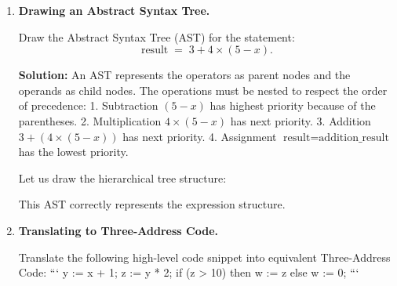 \documentclass[12pt, a4paper]{book}
\begin{document}
\begin{problembox}
\begin{enumerate}[label=\textbf{E\arabic*.}]
  \item \textbf{Drawing an Abstract Syntax Tree.}
  
        Draw the Abstract Syntax Tree (AST) for the statement:
        \[
          \text{result} \;=\; 3 + 4 \times (5 - x).
        \]
        
        \textbf{Solution:}
        An AST represents the operators as parent nodes and the operands as child nodes.
        The operations must be nested to respect the order of precedence:
        1. Subtraction $(5 - x)$ has highest priority because of the parentheses.
        2. Multiplication $4 \times (5 - x)$ has next priority.
        3. Addition $3 + (4 \times (5 - x))$ has next priority.
        4. Assignment $\text{result} = \text{addition\_result}$ has the lowest priority.
        
        Let us draw the hierarchical tree structure:
        \begin{center}
        \end{center}
        This AST correctly represents the expression structure.
        
  \item \textbf{Translating to Three-Address Code.}
  
        Translate the following high-level code snippet into equivalent Three-Address Code:
        ```
          y := x + 1;
          z := y * 2;
          if (z > 10) then
              w := z
          else
              w := 0;
        ```
        

\end{enumerate}
\end{problembox}
\end{document}
